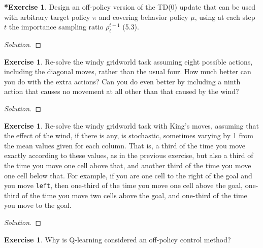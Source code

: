 \documentclass[oneside,11pt]{article}
\theoremstyle{definition}
\newtheorem{exer}[thm]{Exercise}
\newtheorem{exerstar}[thm]{*Exercise}
\newenvironment{solution}
{\renewcommand\qedsymbol{$\blacksquare$}\begin{proof}[Solution]} {\end{proof}}
\begin{document}
\begin{exerstar}
Design an off-policy version of the TD(0) update that can be used
with arbitrary target policy $\pi$ and covering behavior policy $\mu$, using at each step $t$ the importance sampling ratio $\rho_t^{t+1}$ (5.3).
\end{exerstar}

\begin{shaded}
\begin{solution} 


\end{solution} 
\end{shaded}


\begin{exer}
Re-solve the windy gridworld task assuming eight possible actions, including the diagonal moves, rather than the usual four. How much better can you do with the extra actions? Can you do even better by including a ninth action that causes no movement at all other than that caused by the wind?
\end{exer}

\begin{shaded}
\begin{solution} 


\end{solution} 
\end{shaded}


\begin{exer}
Re-solve the windy gridworld task with King's moves, assuming that the effect of the wind, if there is any, is stochastic, sometimes varying by 1 from the mean values given for each column. That is, a third of the time you move exactly according to these values, as in the previous exercise, but also a third of the time you move one cell above that, and another third of the time you move one cell below that. For example, if you are one cell to the right of the goal and you move \texttt{left}, then one-third of the time you move one cell above the goal, one-third of the time you move two cells above the goal, and one-third of the time you move to the goal.
\end{exer}

\begin{shaded}
\begin{solution} 


\end{solution} 
\end{shaded}


\begin{exer}
Why is Q-learning considered an off-policy control method?
\end{exer}
\end{document}
